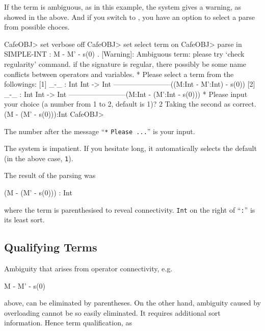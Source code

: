 \documentclass[a4paper]{memoir}
\begin{document}
If the term is ambiguous, as in this example, the system gives a
warning, as showed in the above.
And if you  switch  to , 
you have an option to select a parse from possible choces.
\begin{vvtm}
\begin{ccode}
CafeOBJ> set verbose off
CafeOBJ> set select term on
CafeOBJ> parse in SIMPLE-INT : M - M' - s(0) .
[Warning]: Ambiguous term:
    please try `check regularity' command.
    if the signature is regular, there possibly be 
    some name conflicts between operators and variables.
* Please select a term from the followings:
[1] _-_ : Int Int -> Int ------------------------((M:Int - M':Int) - s(0))
[2] _-_ : Int Int -> Int ------------------------(M:Int - (M':Int - s(0)))
* Please input your choice (a number from 1 to 2, default is 1)? 2
Taking the second as correct.
(M - (M' - s(0))):Int
CafeOBJ> 
\end{ccode}
\end{vvtm}
The number after the message ``\verb|*| \verb|Please ...|'' is
your input.

\begin{warning}
  The system is impatient. If you hesitate long, it automatically
  selects the default (in the above case, \verb|1|).
\end{warning}

The result of the parsing was
\begin{vvtm}
\begin{ccode}
  (M - (M' - s(0))) : Int
\end{ccode}
\end{vvtm}
where the term is parenthesised to reveal connectivity.
\verb|Int| on the right of ``\verb|:|'' is its least sort.

\subsection{Qualifying Terms}\label{sec:p2-qualifying-terms}

Ambiguity that arises from operator connectivity, e.g.
\begin{vvtm}
\begin{ccode}
  M - M' - s(0)
\end{ccode}
\end{vvtm}
above, can be eliminated by parentheses. On the other hand, ambiguity caused
by overloading cannot be so easily eliminated. It requires additional
sort information. Hence term qualification, as
\end{document}
